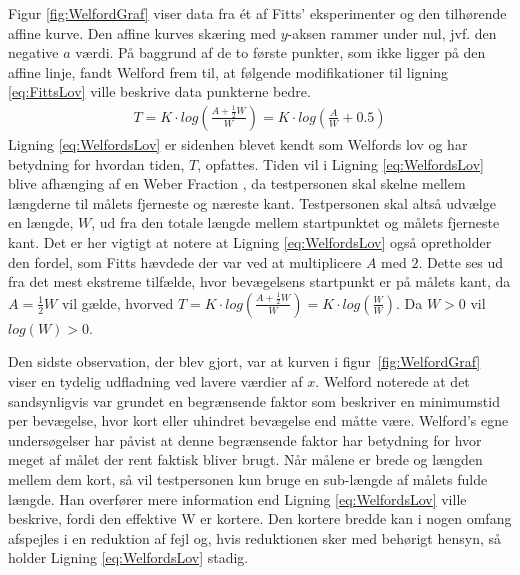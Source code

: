 Figur \ref{fig:WelfordGraf} viser data fra ét af Fitts' eksperimenter og den tilhørende affine kurve. Den affine kurves skæring med $y$-aksen rammer under nul, jvf. den negative $a$ værdi. På baggrund af de to første punkter, som ikke ligger på den affine linje, fandt Welford frem til, at følgende modifikationer til ligning \ref{eq:FittsLov} ville beskrive data punkterne bedre.
\begin{align}\label{eq:WelfordsLov}
T = K \cdot log\left(\frac{A + \frac{1}{2}W}{W}\right) = K \cdot log\left(\frac{A}{W} + 0.5\right)
\end{align}
Ligning \ref{eq:WelfordsLov} er sidenhen blevet kendt som Welfords lov og har betydning for hvordan tiden, $T$, opfattes. Tiden vil i Ligning \ref{eq:WelfordsLov} blive afhænging af en Weber Fraction \cite{welford1958}, da testpersonen skal skelne mellem længderne til målets fjerneste og næreste kant. Testpersonen skal altså udvælge en længde, $W$, ud fra den totale længde mellem startpunktet og målets fjerneste kant. Det er her vigtigt at notere at Ligning \ref{eq:WelfordsLov} også opretholder den fordel, som Fitts hævdede der var ved at multiplicere $A$ med $2$. Dette ses ud fra det mest ekstreme tilfælde, hvor bevægelsens startpunkt er på målets kant, da $A = \frac{1}{2}W$ vil gælde, hvorved $T = K \cdot log\left(\frac{A + \frac{1}{2}W}{W}\right) = K \cdot log\left(\frac{W}{W}\right)$. Da $W > 0$ vil $log(W) > 0$.

Den sidste observation, der blev gjort, var at kurven i figur~\ref{fig:WelfordGraf} viser en tydelig udfladning ved lavere værdier af $x$. Welford noterede at det sandsynligvis var grundet en begrænsende faktor som beskriver en minimumstid per bevægelse, hvor kort eller uhindret bevægelse end måtte være. Welford's egne undersøgelser har påvist at denne begrænsende faktor har betydning for hvor meget af målet der rent faktisk bliver brugt. Når målene er brede og længden mellem dem kort, så vil testpersonen kun bruge en sub-længde af målets fulde længde. Han overfører mere information end Ligning \ref{eq:WelfordsLov} ville beskrive, fordi den effektive W er kortere. Den kortere bredde kan i nogen omfang afspejles i en reduktion af fejl og, hvis reduktionen sker med behørigt hensyn, så holder Ligning \ref{eq:WelfordsLov} stadig.

